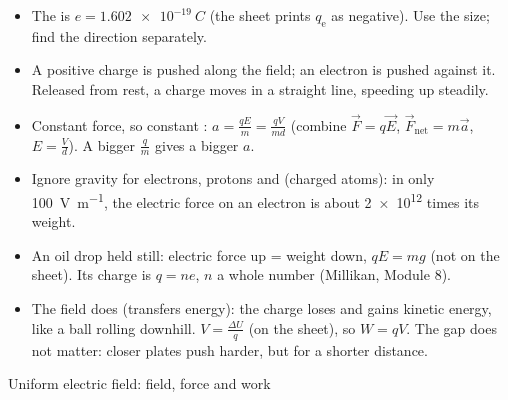 \begin{itemize}
  \item The  is $e = \qty{1.602e-19}{C}$ (the sheet prints
        $q_\mathrm{e}$ as negative). Use the size; find the direction separately.
  \item A positive charge is pushed along the field; an electron is pushed against
        it. Released from rest, a charge moves in a straight line, speeding up
        steadily.
  \item Constant force, so constant :
        $a = \frac{qE}{m} = \frac{qV}{md}$ (combine $\vec{F} = q\vec{E}$,
        $\vec{F}_\mathrm{net} = m\vec{a}$, $E = \frac{V}{d}$). A bigger
         $\frac{q}{m}$ gives a bigger $a$.
  \item Ignore gravity for electrons, protons and  (charged atoms): in
        only \qty{100}{V.m^{-1}}, the electric force on an electron is about
        \num{2e12} times its weight.
  \item An oil drop held still: electric force up = weight down, $qE = mg$ (not on
        the sheet). Its charge is $q = ne$, $n$ a whole number (Millikan, Module 8).
  \item The field does  (transfers energy): the charge loses
         and gains kinetic energy, like a ball
        rolling downhill. $V = \frac{\Delta U}{q}$ (on the sheet), so $W = qV$.
        The gap does not matter: closer plates push harder, but for a shorter
        distance.
\end{itemize}

\begin{formulacard}{Uniform electric field: field, force and work}
  \begin{symbols}
  \end{symbols}
\end{formulacard}

